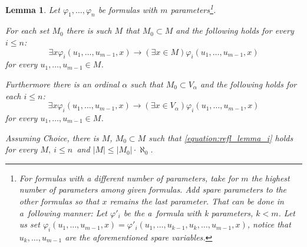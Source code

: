 \documentclass[12pt,a4paper]{article}
\newtheorem{lemma}[theorem]{Lemma}
\newcommand{\then}{\rightarrow}
\newcommand{\bce}{\begin{compactenum}}
\newcommand{\ece}{\end{compactenum}}
\begin{document}
\begin{lemma}{ }\label{lemma:reflection_lemma}
Let $\varphi_1, \ldots, \varphi_n$ be formulas with $m$ parameters\footnote{For formulas with a different number of parameters, take for $m$ the highest number of parameters among given formulas. Add spare parameters to the other formulas so that $x$ remains the last parameter. That can be done in a~following manner: Let $\varphi'_i$ be the a~formula with k parameters, $k < m$. Let us set $\varphi_i(u_1, \ldots, u_{m-1}, x) = \varphi'_i(u_1, \ldots, u_{k-1}, u_k, \ldots, u_{m-1}, x)$, notice that $u_k, \ldots, u_{m-1}$ are the aforementioned spare variables.}. 
\bce[(i)]
\item For each set $M_0$ there is such $M$ that $M_0 \subset M$ and the following holds for every $i \leq n$:
\begin{equation}\label{equation:refl_lemma_i}
\exists x \varphi_i(u_1, \ldots, u_{m-1}, x) \then (\exists x \in M) \varphi_i(u_1, \ldots, u_{m-1}, x)
\end{equation}
for every $u_1, \ldots, u_{m-1} \in M$.

\item Furthermore there is an ordinal $\alpha$ such that $M_0 \subset V_\alpha$ and the following holds for each $i \leq n$:
\begin{equation}\label{equation:refl_lemma_ii}
\exists x \varphi_i(u_1, \ldots, u_{m-1}, x) \then (\exists x \in V_\alpha) \varphi_i(u_1, \ldots, u_{m-1}, x)
\end{equation}
for every $u_1, \ldots, u_{m-1} \in M$.

\item Assuming \emph{Choice}, there is $M$, $M_0 \subset M$ such that \ref{equation:refl_lemma_i} holds for every $M,\ i \leq n$ and $|M| \leq |M_0| \cdot \aleph_0$.
\ece
\end{lemma}
\end{document}
